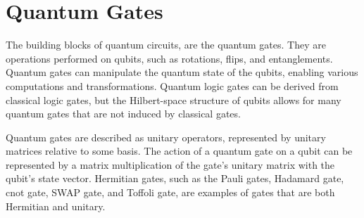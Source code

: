 \documentclass[inscr,ack,preface]{diphdthesis}
\begin{document}
\cite{kockum2014quantum}


\section{Quantum Gates}

The building blocks of quantum circuits, are the quantum gates. They are operations performed on \acrshort{qubit}s, such as rotations, flips, and entanglements. Quantum gates can manipulate the quantum state of the \acrshort{qubit}s, enabling various computations and transformations. Quantum logic gates can be derived from classical logic gates, but the Hilbert-space structure of \acrshort{qubit}s allows for many quantum gates that are not induced by classical gates.

Quantum gates are described as unitary operators, represented by unitary matrices relative to some basis. The action of a quantum gate on a \acrshort{qubit} can be represented by a matrix multiplication of the gate's unitary matrix with the \acrshort{qubit}'s state vector. Hermitian gates, such as the Pauli gates, Hadamard gate, \acrshort{cnot} gate, SWAP gate, and Toffoli gate, are examples of gates that are both Hermitian and unitary.
\end{document}
